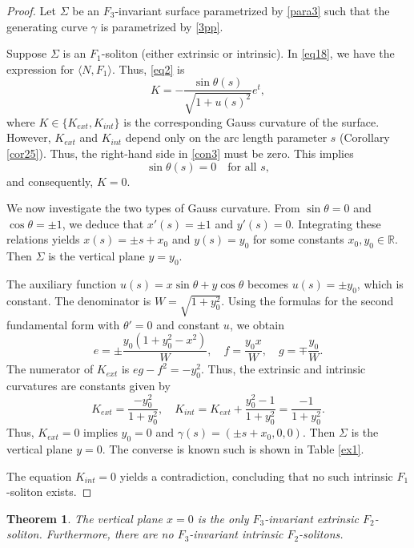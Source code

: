 \documentclass[a4paper,12pt]{amsart}
\theoremstyle{plain}
\newtheorem{theorem}{Theorem}[section]
\theoremstyle{definition}
\def\r{\mathbb R}
\begin{document}
\begin{proof} Let $\Sigma$ be an $F_3$-invariant surface parametrized by \eqref{para3} such that the generating curve $\gamma$ is parametrized by \eqref{3pp}.

Suppose $\Sigma$ is an $F_1$-soliton (either extrinsic or intrinsic). In \eqref{eq18}, we have the expression for $\langle N,F_1\rangle$. Thus, \eqref{eq2} is 
\begin{equation}\label{con3}
K = -\frac{\sin\theta(s)}{\sqrt{1+u(s)^2}}e^t,
\end{equation}
where $K \in \{K_{ext}, K_{int}\}$ is the corresponding Gauss curvature of the surface. However, $K_{ext}$ and $K_{int}$ depend only on the arc length parameter $s$ (Corollary \ref{cor25}). Thus, the right-hand side in \eqref{con3} must be zero. This implies $$\sin\theta(s) = 0 \quad \text{for all } s,$$
and consequently, $K=0$.

We now investigate the two types of Gauss curvature. From $\sin\theta = 0$ and $\cos\theta = \pm 1$, we deduce that $x'(s) = \pm 1$ and $y'(s) = 0$. Integrating these relations yields $x(s) = \pm s + x_0$ and $y(s) = y_0$ for some constants $x_0, y_0 \in \r$. Then $\Sigma$ is the vertical plane $y=y_0$. 

The auxiliary function $u(s) = x\sin\theta + y\cos\theta$ becomes $u(s) = \pm y_0$, which is constant. The denominator is $W = \sqrt{1+y_0^2}$. Using the formulas for the second fundamental form with $\theta' = 0$ and constant $u$, we obtain 
$$e = \pm \frac{y_0(1+y_0^2-x^2)}{W},\quad f = \frac{y_0 x}{W},\quad g = \mp \frac{y_0}{W}.$$
 The numerator of $K_{ext}$ is $eg - f^2 = -y_0^2$. Thus, the extrinsic and intrinsic curvatures are constants given by
$$K_{ext} = \frac{-y_0^2}{1+y_0^2}, \quad K_{int} = K_{ext} + \frac{y_0^2 - 1}{1+y_0^2} = \frac{-1}{1+y_0^2}.$$
Thus, $K_{ext}=0$ implies $y_0=0$ and $\gamma(s) = (\pm s + x_0, 0, 0)$. Then $\Sigma$ is the vertical plane $y = 0$. The converse is known such is shown in Table \ref{ex1}.

The equation $K_{int} = 0$ yields a contradiction, concluding that no such intrinsic $F_1$-soliton exists.
\end{proof}

 \begin{theorem}\label{t42}
 The vertical plane $x=0$ is the only $F_3$-invariant extrinsic $F_2$-soliton. Furthermore, there are no $F_3$-invariant intrinsic $F_2$-solitons.
\end{theorem}
\end{document}
